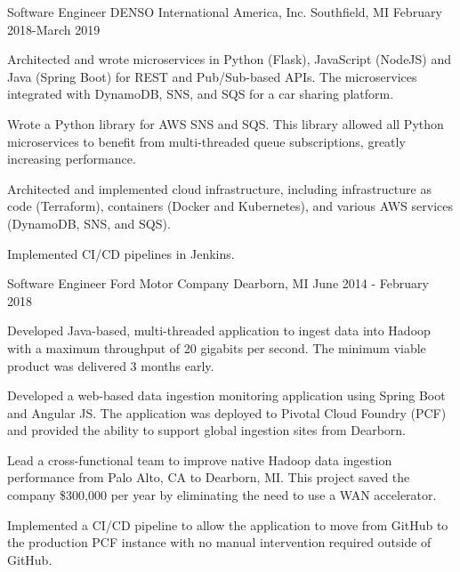 \documentclass[11pt, a4paper]{awesome-cv}
\begin{document}
\begin{cventries}
    \cventry
    {Software Engineer}
    {DENSO International America, Inc.}
    {Southfield, MI}
    {February 2018-March 2019}
    {
        \begin{cvitems}
            \item{Architected and wrote microservices in Python (Flask), JavaScript (NodeJS) and Java (Spring Boot) for REST and Pub/Sub-based APIs. The microservices integrated with DynamoDB, SNS, and SQS for a car sharing platform.}
            \item{Wrote a Python library for AWS SNS and SQS. This library allowed all Python microservices to benefit from multi-threaded queue subscriptions, greatly increasing performance.}
            \item{Architected and implemented cloud infrastructure, including infrastructure as code (Terraform), containers (Docker and Kubernetes), and various AWS services (DynamoDB, SNS, and SQS).}
            \item{Implemented CI/CD pipelines in Jenkins.}
        \end{cvitems}
    }

    \cventry
    {Software Engineer}
    {Ford Motor Company}
    {Dearborn, MI}
    {June 2014 - February 2018}
    {
        \begin{cvitems}
            \item{Developed Java-based, multi-threaded application to ingest data into Hadoop with a maximum throughput of 20 gigabits per second. The minimum viable product was delivered 
                  3 months early.}
            \item{Developed a web-based data ingestion monitoring application using Spring Boot and Angular JS. The application was deployed to Pivotal Cloud Foundry (PCF) and provided the 
                  ability to support global ingestion sites from Dearborn.}
            \item{Lead a cross-functional team to improve native Hadoop data ingestion performance from Palo Alto, CA to Dearborn, MI. This project saved the company \$300,000 per year by 
                  eliminating the need to use a WAN accelerator.}
            \item{Implemented a CI/CD pipeline to allow the application to move from GitHub to the production PCF instance with no manual 
                  intervention required outside of GitHub.}
        \end{cvitems}
    }
\end{cventries}
\end{document}
